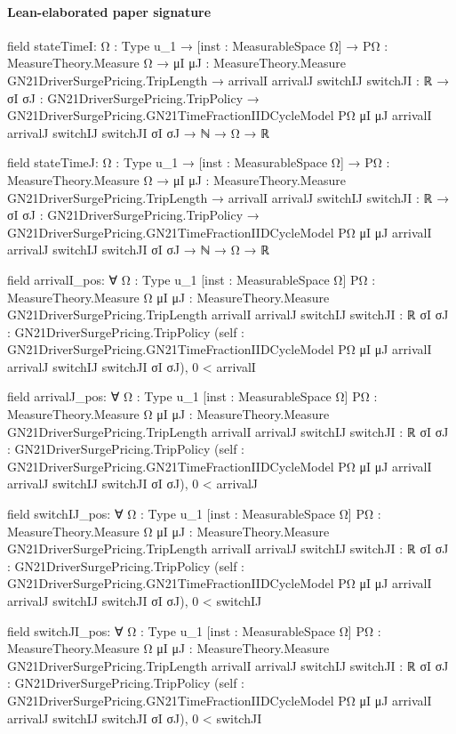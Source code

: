 \documentclass[10pt]{article}
\begin{document}
\paragraph{Lean-elaborated paper signature}
\begin{ReviewVerbatim}
field stateTimeI:
{Ω : Type u_1} →
  [inst : MeasurableSpace Ω] →
    {PΩ : MeasureTheory.Measure Ω} →
      {μI μJ : MeasureTheory.Measure GN21DriverSurgePricing.TripLength} →
        {arrivalI arrivalJ switchIJ switchJI : ℝ} →
          {σI σJ : GN21DriverSurgePricing.TripPolicy} →
            GN21DriverSurgePricing.GN21TimeFractionIIDCycleModel PΩ μI μJ arrivalI arrivalJ switchIJ switchJI σI σJ →
              ℕ → Ω → ℝ

field stateTimeJ:
{Ω : Type u_1} →
  [inst : MeasurableSpace Ω] →
    {PΩ : MeasureTheory.Measure Ω} →
      {μI μJ : MeasureTheory.Measure GN21DriverSurgePricing.TripLength} →
        {arrivalI arrivalJ switchIJ switchJI : ℝ} →
          {σI σJ : GN21DriverSurgePricing.TripPolicy} →
            GN21DriverSurgePricing.GN21TimeFractionIIDCycleModel PΩ μI μJ arrivalI arrivalJ switchIJ switchJI σI σJ →
              ℕ → Ω → ℝ

field arrivalI_pos:
∀ {Ω : Type u_1} [inst : MeasurableSpace Ω] {PΩ : MeasureTheory.Measure Ω}
  {μI μJ : MeasureTheory.Measure GN21DriverSurgePricing.TripLength} {arrivalI arrivalJ switchIJ switchJI : ℝ}
  {σI σJ : GN21DriverSurgePricing.TripPolicy}
  (self : GN21DriverSurgePricing.GN21TimeFractionIIDCycleModel PΩ μI μJ arrivalI arrivalJ switchIJ switchJI σI σJ),
  0 < arrivalI

field arrivalJ_pos:
∀ {Ω : Type u_1} [inst : MeasurableSpace Ω] {PΩ : MeasureTheory.Measure Ω}
  {μI μJ : MeasureTheory.Measure GN21DriverSurgePricing.TripLength} {arrivalI arrivalJ switchIJ switchJI : ℝ}
  {σI σJ : GN21DriverSurgePricing.TripPolicy}
  (self : GN21DriverSurgePricing.GN21TimeFractionIIDCycleModel PΩ μI μJ arrivalI arrivalJ switchIJ switchJI σI σJ),
  0 < arrivalJ

field switchIJ_pos:
∀ {Ω : Type u_1} [inst : MeasurableSpace Ω] {PΩ : MeasureTheory.Measure Ω}
  {μI μJ : MeasureTheory.Measure GN21DriverSurgePricing.TripLength} {arrivalI arrivalJ switchIJ switchJI : ℝ}
  {σI σJ : GN21DriverSurgePricing.TripPolicy}
  (self : GN21DriverSurgePricing.GN21TimeFractionIIDCycleModel PΩ μI μJ arrivalI arrivalJ switchIJ switchJI σI σJ),
  0 < switchIJ

field switchJI_pos:
∀ {Ω : Type u_1} [inst : MeasurableSpace Ω] {PΩ : MeasureTheory.Measure Ω}
  {μI μJ : MeasureTheory.Measure GN21DriverSurgePricing.TripLength} {arrivalI arrivalJ switchIJ switchJI : ℝ}
  {σI σJ : GN21DriverSurgePricing.TripPolicy}
  (self : GN21DriverSurgePricing.GN21TimeFractionIIDCycleModel PΩ μI μJ arrivalI arrivalJ switchIJ switchJI σI σJ),
  0 < switchJI


\end{ReviewVerbatim}
\end{document}
